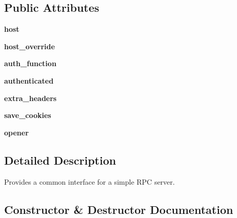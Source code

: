 \subsection*{Public Attributes}
\begin{DoxyCompactItemize}
\item 
\mbox{\label{classupload_1_1AbstractRpcServer_ab7188d827e2faddcf970f524f5856192}} 
{\bfseries host}
\item 
\mbox{\label{classupload_1_1AbstractRpcServer_a783a4a7e4ffb776a57a3f267300a213b}} 
{\bfseries host\+\_\+override}
\item 
\mbox{\label{classupload_1_1AbstractRpcServer_aee0090a3bcf07b913a7dd596a5dabb8f}} 
{\bfseries auth\+\_\+function}
\item 
\mbox{\label{classupload_1_1AbstractRpcServer_a692955750c802e461c6336d3000cd365}} 
{\bfseries authenticated}
\item 
\mbox{\label{classupload_1_1AbstractRpcServer_adbbf0109afc13d58d7815fa143cb779f}} 
{\bfseries extra\+\_\+headers}
\item 
\mbox{\label{classupload_1_1AbstractRpcServer_affe342205c4647d41b127f5a5634858b}} 
{\bfseries save\+\_\+cookies}
\item 
\mbox{\label{classupload_1_1AbstractRpcServer_aa931446476e0e86f3ade7fef0a0aea5a}} 
{\bfseries opener}
\end{DoxyCompactItemize}


\subsection{Detailed Description}
\begin{DoxyVerb}Provides a common interface for a simple RPC server.\end{DoxyVerb}
 

\subsection{Constructor \& Destructor Documentation}
\mbox{\label{classupload_1_1AbstractRpcServer_a3f6bc1bd16b52bd5a5c33a1fedeef2d0}} 
